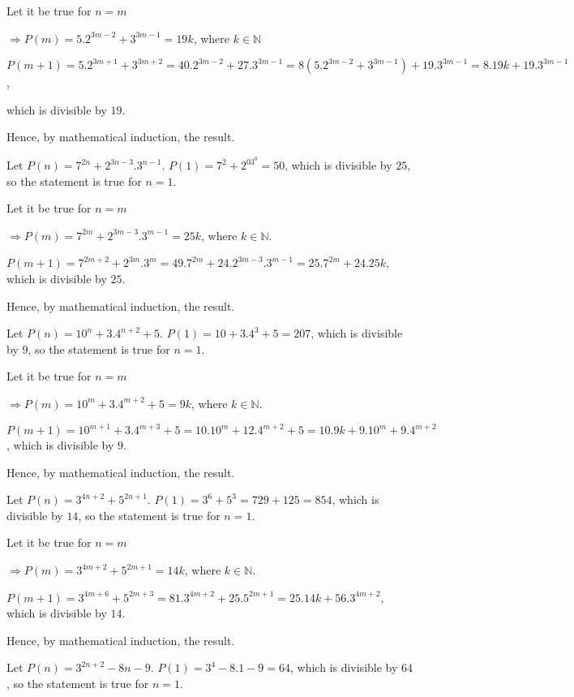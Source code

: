   Let it be true for $n = m$

  $\Rightarrow P(m) = 5.2^{3m - 2} + 3^{3m - 1} = 19k$, where $k\in\mathbb{N}$

  $P(m + 1) = 5.2^{3m + 1} + 3^{3m + 2} = 40.2^{3m - 2} + 27.3^{3m - 1} = 8(5.2^{3m - 2} + 3^{3m - 1}) +
  19.3^{3m - 1} = 8.19k + 19.3^{3m - 1}$,

  which is divisible by $19$.

  Hence, by mathematical induction, the result.
\item Let $P(n) = 7^{2n} + 2^{3n - 3}.3^{n - 1}$. $P(1) = 7^2 + 2^03^0 = 50$, which is divisible by $25$, so
  the statement is true for $n = 1$.

  Let it be true for $n = m$

  $\Rightarrow P(m) = 7^{2m} + 2^{3m - 3}.3^{m - 1} = 25k$, where $k\in\mathbb{N}$.

  $P(m + 1) = 7^{2m + 2} + 2^{3m}.3^m = 49.7^{2m} + 24.2^{3m - 3}.3^{m - 1} = 25.7^{2m} + 24.25k$, which is
  divisible by $25$.

  Hence, by mathematical induction, the result.
\item Let $P(n) = 10^n + 3.4^{n + 2} + 5$. $P(1) = 10 + 3.4^3 + 5 = 207$, which is divisible by $9$, so the
  statement is true for $n = 1$.

  Let it be true for $n = m$

  $\Rightarrow P(m) = 10^m  + 3.4^{m + 2} + 5 = 9k$, where $k\in\mathbb{N}$.

  $P(m + 1) = 10^{m + 1} + 3.4^{m + 3} + 5 = 10.10^m + 12.4^{m + 2} + 5 = 10.9k + 9.10^m + 9.4^{m + 2}$,
  which is divisible by $9$.

  Hence, by mathematical induction, the result.
\item Let $P(n) = 3^{4n + 2} + 5^{2n + 1}$. $P(1) = 3^6 + 5^3 = 729 + 125 = 854$, which is divisible by
  $14$, so the statement is true for $n = 1$.

  Let it be true for $n = m$

  $\Rightarrow P(m) = 3^{4m + 2} + 5^{2m + 1} = 14k$, where $k\in\mathbb{N}$.

  $P(m + 1) = 3^{4m + 6} + 5^{2m + 3} = 81.3^{4m + 2} + 25.5^{2m + 1} = 25.14k + 56.3^{4m + 2}$, which is
  divisible by $14$.

  Hence, by mathematical induction, the result.
\item Let $P(n) = 3^{2n + 2} - 8n - 9$. $P(1) = 3^4 - 8.1 - 9 = 64$, which is divisible by $64$, so the
  statement is true for $n = 1$.

